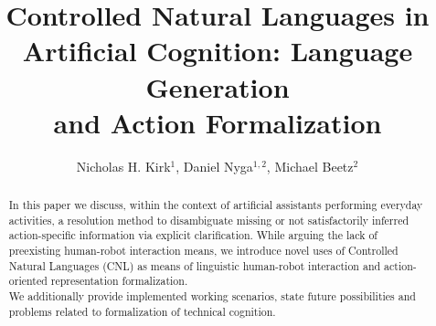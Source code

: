 \documentclass[oribibl]{llncs}
\begin{document}
\frontmatter          %

\pagestyle{headings}  %
\title{Controlled Natural Languages in\\ Artificial Cognition: Language Generation \\and Action Formalization}
%
\author{Nicholas H. Kirk$^1$, Daniel Nyga$^{1,2}$, Michael Beetz$^2$}
%
%
%
\maketitle              %
\begin{abstract}

In this paper we discuss, within the context of artificial assistants
 performing everyday activities, a resolution method to disambiguate 
 missing or not satisfactorily inferred action-specific information 
 via explicit clarification.
While arguing the lack of preexisting human-robot interaction means, 
we introduce novel uses of Controlled Natural Languages (CNL)
as means of linguistic human-robot interaction and action-oriented 
representation formalization.\\
We additionally provide implemented working scenarios, 
state future possibilities and problems related to formalization 
of technical cognition.

 \end{abstract}
\end{document}
